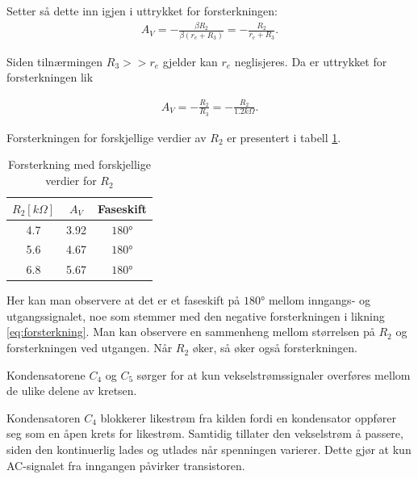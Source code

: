             Setter så dette inn igjen i uttrykket for forsterkningen:
            \begin{align*}
                A_V = -\frac{\beta R_2}{\beta (r_e + R_3)} = -\frac{R_2}{r_e + R_3}.
            \end{align*}

            Siden tilnærmingen $R_3 >> r_e$ gjelder kan $r_e$ neglisjeres. Da er uttrykket for forsterkningen lik

            \begin{align} 
                A_V = -\frac{R_2}{R_3} = -\frac{R_2}{1.2k\Omega}. \label{eq:forsterkning}
            \end{align}

            Forsterkningen for forskjellige verdier av $R_2$ er presentert i tabell \ref{tab:forsterkning1}.
            \begin{table}[h]
                \centering
                \caption{Forsterkning med forskjellige verdier for $R_2$}
                \label{tab:forsterkning1}
                \begin{tabular}{|c|c|c|}
                    \hline
                    \rowcolor[gray]{0.9}
                    \textbf{$R_2 [k\Omega]$} & \textbf{$A_V$} & \textbf{Faseskift} \\ \hline
                    4.7                      & 3.92           & $\ang{180}$ \\ \hline
                    5.6                      & 4.67           & $\ang{180}$ \\ \hline
                    6.8                      & 5.67           & $\ang{180}$ \\ \hline
                \end{tabular}
            \end{table}

            Her kan man observere at det er et faseskift på $\ang{180}$ mellom inngangs- og utgangssignalet, noe som stemmer med den negative forsterkningen i likning \eqref{eq:forsterkning}. 
            Man kan observere en sammenheng mellom størrelsen på $R_2$ og forsterkningen ved utgangen. Når $R_2$ øker, så øker også forsterkningen.

            Kondensatorene $C_4$ og $C_5$ sørger for at kun vekselstrømssignaler overføres mellom de ulike delene av kretsen.

            Kondensatoren $C_4$ blokkerer likestrøm fra kilden fordi en kondensator oppfører seg som en åpen krets for likestrøm. Samtidig tillater den vekselstrøm å passere, siden den kontinuerlig lades og utlades når spenningen varierer. Dette gjør at kun AC-signalet fra inngangen påvirker transistoren.

